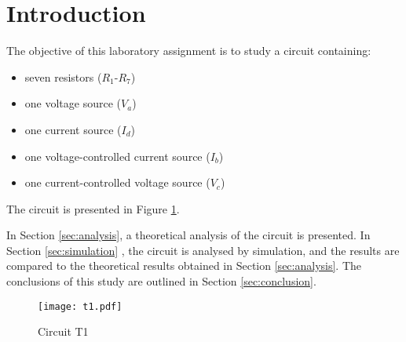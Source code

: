 \section{Introduction}
\label{sec:introduction}

The objective of this laboratory assignment is to study a circuit containing:
\begin{itemize}
	\item seven resistors ($R_1$-$R_7$)
	\item one voltage source ($V_a$)
	\item one current source ($I_d$)
	\item one voltage-controlled current source ($I_b$)
	\item one current-controlled voltage source ($V_c$)
\end{itemize}
The circuit is presented in Figure \ref{fig:Desenho_t1}.

In Section \ref{sec:analysis}, a theoretical analysis of the circuit is
presented. In Section \ref{sec:simulation} , the circuit is analysed by simulation,
and the results are compared to the theoretical results obtained in Section
\ref{sec:analysis}. The conclusions of this study are outlined in Section \ref{sec:conclusion}.


\begin{figure}[h]
	\centering
	\texttt{[image: t1.pdf]}
	\caption{Circuit T1}
\label{fig:Desenho_t1}
\end{figure}

